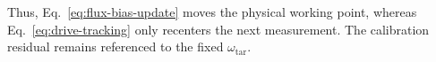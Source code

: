 Thus, Eq.~\eqref{eq:flux-bias-update} moves the physical working point,
whereas Eq.~\eqref{eq:drive-tracking} only recenters the next measurement.
The calibration residual remains referenced to the fixed
$\omega_{\mathrm{tar}}$.




